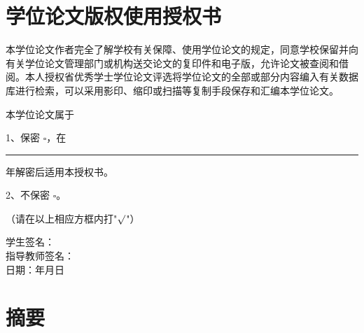 \documentclass[zihao=-4,a4paper]{ctexart}
\begin{document}
\newpage
\section*{学位论文版权使用授权书}

\vspace{1cm}

{\songti
本学位论文作者完全了解学校有关保障、使用学位论文的规定，同意学校保留并向有关学位论文管理部门或机构送交论文的复印件和电子版，允许论文被查阅和借阅。本人授权省优秀学士学位论文评选将学位论文的全部或部分内容编入有关数据库进行检索，可以采用影印、缩印或扫描等复制手段保存和汇编本学位论文。

\vspace{1cm}

本学位论文属于

\vspace{0.5cm}

1、保密 $\square$，在\rule{1cm}{0.3pt}年解密后适用本授权书。

\vspace{0.3cm}

2、不保密 $\square$。

\vspace{0.3cm}

（请在以上相应方框内打"$\surd$"）

\vspace{2cm}

\begin{flushright}
学生签名：\hspace{3cm}\\
\vspace{0.5cm}
指导教师签名：\hspace{3cm}\\
\vspace{0.5cm}
日\hspace{2em}期：\hspace{1cm}年\hspace{1cm}月\hspace{1cm}日
\end{flushright}
}

\newpage
\section*{摘\hspace{2em}要}
\end{document}
